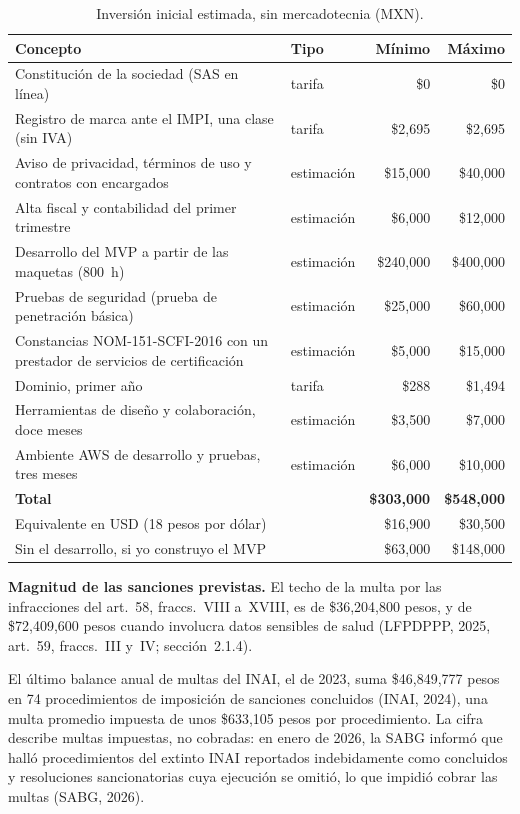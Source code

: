 \documentclass[12pt, a4paper]{article}
\begin{document}
\begin{table}[!htbp]
  \centering
  \caption{Inversión inicial estimada, sin mercadotecnia (MXN).}
  \label{tab:inversion}
  \footnotesize
  \begin{tabularx}{\textwidth}{X l r r}
    \toprule
    \textbf{Concepto} & \textbf{Tipo} & \textbf{Mínimo} & \textbf{Máximo} \\
    \midrule
    Constitución de la sociedad (SAS en línea) & tarifa & \$0 & \$0 \\
    Registro de marca ante el IMPI, una clase (sin IVA) & tarifa & \$2,695 & \$2,695 \\
    Aviso de privacidad, términos de uso y contratos con encargados & estimación & \$15,000 & \$40,000 \\
    Alta fiscal y contabilidad del primer trimestre & estimación & \$6,000 & \$12,000 \\
    Desarrollo del MVP a partir de las maquetas (800~h) & estimación & \$240,000 & \$400,000 \\
    Pruebas de seguridad (prueba de penetración básica) & estimación & \$25,000 & \$60,000 \\
    Constancias NOM-151-SCFI-2016 con un prestador de servicios de certificación & estimación & \$5,000 & \$15,000 \\
    Dominio, primer año & tarifa & \$288 & \$1,494 \\
    Herramientas de diseño y colaboración, doce meses & estimación & \$3,500 & \$7,000 \\
    Ambiente AWS de desarrollo y pruebas, tres meses & estimación & \$6,000 & \$10,000 \\
    \midrule
    \textbf{Total} & & \textbf{\$303,000} & \textbf{\$548,000} \\
    Equivalente en USD (18 pesos por dólar) & & \$16,900 & \$30,500 \\
    Sin el desarrollo, si yo construyo el MVP & & \$63,000 & \$148,000 \\
    \bottomrule
  \end{tabularx}
\end{table}
 
\textbf{Magnitud de las sanciones previstas.} El techo de la multa
por las infracciones del art.~58, fraccs.~VIII a~XVIII, es de \$36,204,800
pesos, y de \$72,409,600
pesos cuando involucra datos sensibles de salud (LFPDPPP, 2025,
art.~59, fraccs.~III y~IV; sección~2.1.4).

El último balance anual de multas del INAI, el de 2023, suma \$46,849,777 pesos en
74 procedimientos de imposición de sanciones concluidos (INAI, 2024), una multa promedio impuesta de unos \$633,105 pesos por
procedimiento. La cifra describe multas impuestas, no
cobradas: en enero de 2026, la SABG
informó que halló procedimientos del extinto INAI reportados
indebidamente como concluidos y resoluciones sancionatorias cuya
ejecución se omitió, lo que impidió cobrar las multas (SABG, 2026).
 
\end{document}
